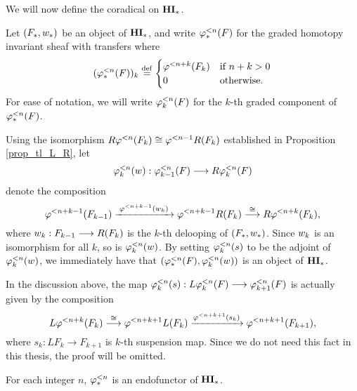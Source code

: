 We will now define the coradical on $\HM$. 

\begin{defn}\label{def_corad_HM}
Let $(F_*, \deloop_*)$ 
be an object of $\HM$, and write $\tlHM{n}(F)$ for the graded 
homotopy invariant sheaf with transfers where
\[
(\tlHM{n}(F))_k \defeq
\begin{cases}
   \tlHI{n + k}(F_k) & \textrm{if } n + k > 0 \\
   0                 & \textrm{otherwise}.
\end{cases}
\]
For ease of notation, we will write $\tlHM[k]{n}(F)$ for the 
$k$-th graded component of $\tlHM{n}(F)$.
\end{defn}

Using the isomorphism $R\tlHI{n}(F_k) \cong \tlHI{n - 1}R(F_k)$ 
established in Proposition \ref{prop_tl_L_R}, let
\[
\deloopTL[k]{n} : \tlHM[k - 1]{n}(F) \to R \tlHM[k]{n}(F) 
\]
denote the composition
\begin{equation}\label{eq_deloop_def}
\tlHI{n + k - 1}(F_{k - 1})
   \xrightarrow{\;\tlHI{n + k - 1}(\deloop_k)\;} 
   \tlHI{n + k - 1} R(F_k) \stackrel{\cong}{\to} 
   R \tlHI{n + k}(F_k),
\end{equation}
where $\deloop_k: F_{k - 1} \to R(F_k)$ is the $k$-th delooping
of $(F_*, \deloop_*)$. Since $\deloop_k$ is an isomorphism 
for all $k$, so is $\deloopTL[k]{n}$. By setting $\suspTL[k]{n}$
to be the adjoint of $\deloopTL[k]{n}$, we immediately have that
$(\tlHM{n}(F), \deloopTL[k]{n})$ is an object of $\HM$. 

\begin{rmk*}
In the discussion above, the map $\suspTL[k]{n}: L\tlHM[k]{n}(F) \to
\tlHM[k + 1]{n}(F)$ is actually given by the composition
\[
L \tlHI{n + k}(F_{k}) \stackrel{\cong}{\to}
\tlHI{n + k + 1}L(F_{k}) \xrightarrow{\tlHI{n + k + 1}(s_k)}
\tlHI{n + k + 1}(F_{k + 1}),
\]
where $s_k: LF_k \to F_{k + 1}$ is $k$-th suspension map. Since
we do not need this fact in this thesis, the proof will be 
omitted.
\end{rmk*}

\begin{lem}\label{lem_tlHM_is_functor}
For each integer $n$, $\tlHM{n}$ is an endofunctor of $\HM$.
\end{lem}

